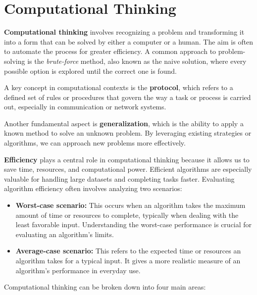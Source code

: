 \chapter{Computational Thinking}
    \textbf{Computational thinking} involves recognizing a problem and transforming it into a form that can be solved by either a computer or a human. The aim is often to automate the process for greater efficiency. A common approach to problem-solving is the \textit{brute-force} method, also known as the naive solution, where every possible option is explored until the correct one is found.
    
    A key concept in computational contexts is the \textbf{protocol}, which refers to a defined set of rules or procedures that govern the way a task or process is carried out, especially in communication or network systems.
    
    Another fundamental aspect is \textbf{generalization}, which is the ability to apply a known method to solve an unknown problem. By leveraging existing strategies or algorithms, we can approach new problems more effectively.
    
    \bigskip
    
    \noindent \textbf{Efficiency} plays a central role in computational thinking because it allows us to save time, resources, and computational power. Efficient algorithms are especially valuable for handling large datasets and completing tasks faster. Evaluating algorithm efficiency often involves analyzing two scenarios:
    
    \begin{itemize}
        \item \textbf{Worst-case scenario:} This occurs when an algorithm takes the maximum amount of time or resources to complete, typically when dealing with the least favorable input. Understanding the worst-case performance is crucial for evaluating an algorithm's limits.
        
        \item \textbf{Average-case scenario:} This refers to the expected time or resources an algorithm takes for a typical input. It gives a more realistic measure of an algorithm's performance in everyday use.
    \end{itemize}
    
    \bigskip
    
    \noindent Computational thinking can be broken down into four main areas:
    
